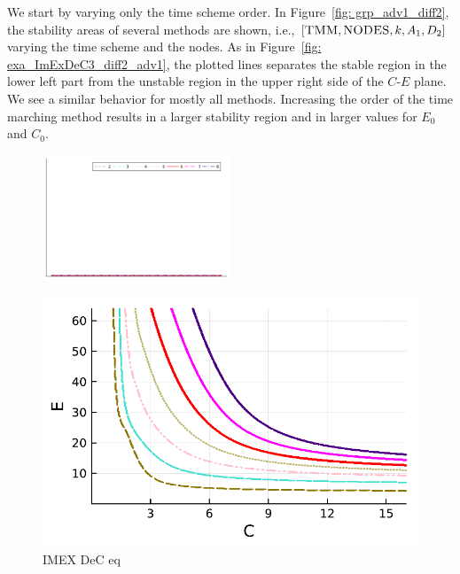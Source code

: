 We start by varying only the time scheme order. 
In Figure~\ref{fig: grp_adv1_diff2}, the stability areas of several methods are shown, i.e., $[\textsc{TMM},\textsc{NODES},k, A_1,D_2]$ varying the time scheme and the nodes. 
As in Figure~\ref{fig: exa_ImExDeC3_diff2_adv1}, the plotted lines separates the stable region in the lower left part from the unstable region in the upper right side of the $C$-$E$ plane. 
We see a similar behavior for mostly all methods. 
Increasing the order of the time marching method results in a larger stability region and in larger values for $E_0$ and $C_0$. 

\begin{figure}
	\centering
	\includegraphics[width=0.5\textwidth,trim={160 340 30 22}, clip]{pdf/pdepics/legends/colors_a-d_new_horiz_2-8_no_order.pdf}\\	\begin{minipage}[t]{0.32\textwidth}
		\includegraphics[width=\textwidth]{pdf/pdepics/diff/IMEXDeC_equispaced_TMM_ord_2-8.pdf}
		\centering
		IMEX DeC eq
	\end{minipage} 
	\begin{minipage}[t]{0.32\textwidth}

\end{minipage}
\end{figure}
